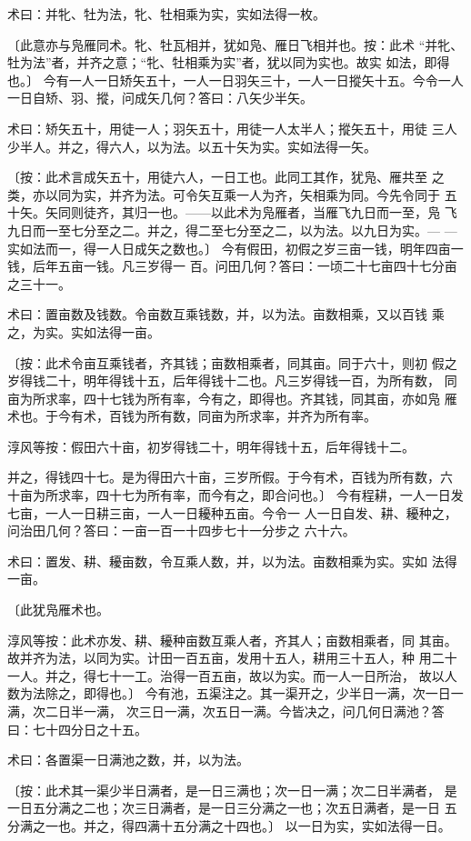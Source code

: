 \documentclass[12pt,UTF8]{ctexbook}
\begin{document}
术曰：并牝、牡为法，牝、牡相乘为实，实如法得一枚。

〔此意亦与凫雁同术。牝、牡瓦相并，犹如凫、雁日飞相并也。按：此术 “并牝、牡为法”者，并齐之意；“牝、牡相乘为实”者，犹以同为实也。故实 如法，即得也。〕 今有一人一日矫矢五十，一人一日羽矢三十，一人一日摐矢十五。今令一人 一日自矫、羽、摐，问成矢几何？答曰：八矢少半矢。

术曰：矫矢五十，用徒一人；羽矢五十，用徒一人太半人；摐矢五十，用徒 三人少半人。并之，得六人，以为法。以五十矢为实。实如法得一矢。

〔按：此术言成矢五十，用徒六人，一日工也。此同工其作，犹凫、雁共至 之类，亦以同为实，并齐为法。可令矢互乘一人为齐，矢相乘为同。今先令同于 五十矢。矢同则徒齐，其归一也。——以此术为凫雁者，当雁飞九日而一至，凫 飞九日而一至七分至之二。并之，得二至七分至之二，以为法。以九日为实。— —实如法而一，得一人日成矢之数也。〕 今有假田，初假之岁三亩一钱，明年四亩一钱，后年五亩一钱。凡三岁得一 百。问田几何？答曰：一顷二十七亩四十七分亩之三十一。

术曰：置亩数及钱数。令亩数互乘钱数，并，以为法。亩数相乘，又以百钱 乘之，为实。实如法得一亩。

〔按：此术令亩互乘钱者，齐其钱；亩数相乘者，同其亩。同于六十，则初 假之岁得钱二十，明年得钱十五，后年得钱十二也。凡三岁得钱一百，为所有数， 同亩为所求率，四十七钱为所有率，今有之，即得也。齐其钱，同其亩，亦如凫 雁术也。于今有术，百钱为所有数，同亩为所求率，并齐为所有率。

淳风等按：假田六十亩，初岁得钱二十，明年得钱十五，后年得钱十二。

并之，得钱四十七。是为得田六十亩，三岁所假。于今有术，百钱为所有数，六 十亩为所求率，四十七为所有率，而今有之，即合问也。〕 今有程耕，一人一日发七亩，一人一日耕三亩，一人一日耰种五亩。今令一 人一日自发、耕、耰种之，问治田几何？答曰：一亩一百一十四步七十一分步之 六十六。

术曰：置发、耕、耰亩数，令互乘人数，并，以为法。亩数相乘为实。实如 法得一亩。

〔此犹凫雁术也。

淳风等按：此术亦发、耕、耰种亩数互乘人者，齐其人；亩数相乘者，同 其亩。故并齐为法，以同为实。计田一百五亩，发用十五人，耕用三十五人，种 用二十一人。并之，得七十一工。治得一百五亩，故以为实。而一人一日所治， 故以人数为法除之，即得也。〕 今有池，五渠注之。其一渠开之，少半日一满，次一日一满，次二日半一满， 次三日一满，次五日一满。今皆决之，问几何日满池？答曰：七十四分日之十五。

术曰：各置渠一日满池之数，并，以为法。

〔按：此术其一渠少半日满者，是一日三满也；次一日一满；次二日半满者， 是一日五分满之二也；次三日满者，是一日三分满之一也；次五日满者，是一日 五分满之一也。并之，得四满十五分满之十四也。〕 以一日为实，实如法得一日。
\end{document}

